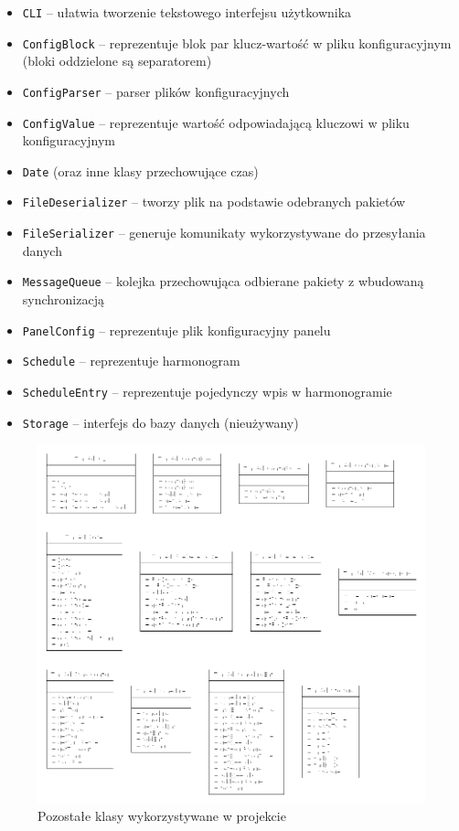 \documentclass[12pt, a4paper]{article}
\providecommand{\tightlist}{%
  \setlength{\itemsep}{0pt}\setlength{\parskip}{0pt}}
\begin{document}
\begin{itemize}
\tightlist
\item \texttt{CLI} -- ułatwia tworzenie tekstowego interfejsu użytkownika
\item \texttt{ConfigBlock} -- reprezentuje blok par klucz-wartość w pliku konfiguracyjnym  (bloki oddzielone są separatorem)
\item \texttt{ConfigParser} -- parser plików konfiguracyjnych 
\item \texttt{ConfigValue} -- reprezentuje wartość odpowiadającą kluczowi w pliku konfiguracyjnym
\item \texttt{Date} (oraz inne klasy przechowujące czas)
\item \texttt{FileDeserializer} -- tworzy plik na podstawie odebranych pakietów
\item \texttt{FileSerializer} -- generuje komunikaty wykorzystywane do przesyłania danych
\item \texttt{MessageQueue} -- kolejka przechowująca odbierane pakiety z wbudowaną synchronizacją
\item \texttt{PanelConfig} -- reprezentuje plik konfiguracyjny panelu
\item \texttt{Schedule} -- reprezentuje harmonogram
\item \texttt{ScheduleEntry} -- reprezentuje pojedynczy wpis w harmonogramie
\item \texttt{Storage} -- interfejs do bazy danych (nieużywany)
\end{itemize}

\begin{figure}[H]
\centering
\includegraphics[width=0.8\linewidth]{class_diagram3}
\caption{Pozostałe klasy wykorzystywane w projekcie}
\label{fig:class_diagram3}
\end{figure}
\end{document}
